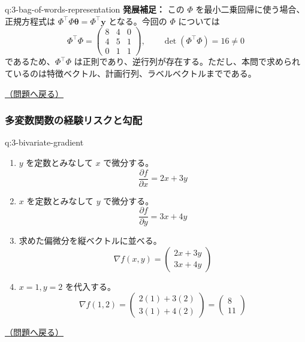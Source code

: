 \documentclass[
  pandoc]{bxjsarticle}
\providecommand{\tightlist}{%
  \setlength{\itemsep}{0pt}\setlength{\parskip}{0pt}}
\begin{document}
\begin{answerbox}[phantomlabel=a:3-bag-of-words-representation]{q:3-bag-of-words-representation}
\textbf{発展補足：} この \(\Phi\) を最小二乗回帰に使う場合、正規方程式は
\(\Phi^\top \Phi \boldsymbol{\theta} = \Phi^\top \mathbf{y}\)
となる。今回の \(\Phi\) については \[
\Phi^\top\Phi
=
\begin{pmatrix}
8 & 4 & 0 \\
4 & 5 & 1 \\
0 & 1 & 1
\end{pmatrix},
\qquad
\det(\Phi^\top\Phi)=16\neq 0
\] であるため、\(\Phi^\top\Phi\)
は正則であり、逆行列が存在する。ただし、本問で求められているのは特徴ベクトル、計画行列、ラベルベクトルまでである。

\hfill 

\hyperref[q:3-bag-of-words-representation]{（問題へ戻る）}

\end{answerbox}

\subsubsection{多変数関数の経験リスクと勾配}\label{ux591aux5909ux6570ux95a2ux6570ux306eux7d4cux9a13ux30eaux30b9ux30afux3068ux52feux914d-1}

\begin{answerbox}[phantomlabel=a:3-bivariate-gradient]{q:3-bivariate-gradient}

\begin{enumerate}
\def\labelenumi{\arabic{enumi}.}
\tightlist
\item
  \(y\) を定数とみなして \(x\) で微分する。 \[
  \frac{\partial f}{\partial x} = 2x + 3y
  \]
\item
  \(x\) を定数とみなして \(y\) で微分する。 \[
  \frac{\partial f}{\partial y} = 3x + 4y
  \]
\item
  求めた偏微分を縦ベクトルに並べる。 \[
  \nabla f(x, y) = \begin{pmatrix} 2x + 3y \\ 3x + 4y \end{pmatrix}
  \]
\item
  \(x=1, y=2\) を代入する。 \[
  \nabla f(1, 2) = \begin{pmatrix} 2(1) + 3(2) \\ 3(1) + 4(2) \end{pmatrix} = \begin{pmatrix} 8 \\ 11 \end{pmatrix}
  \]
\end{enumerate}

\hfill 

\hyperref[q:3-bivariate-gradient]{（問題へ戻る）}

\end{answerbox}
\end{document}
